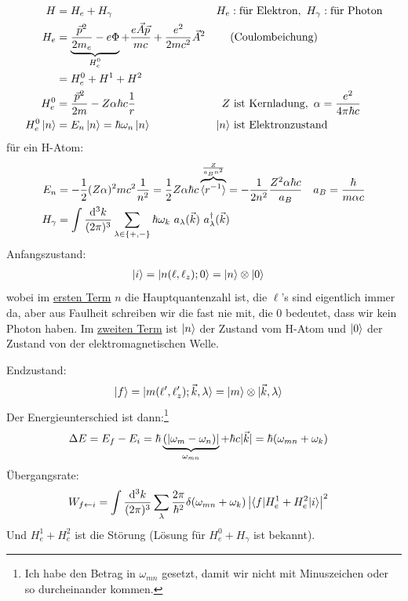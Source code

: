 		\begin{align*}
			H &= H_e + H_\gamma & H_e &: \text{für Elektron}, ~ H_\gamma : \text{für Photon} \\
			H_e &= \underbrace{\frac{\vec{p}^2}{2 m_e} - e \Phi}_{\mathclap{H_e^0}}
			+ \frac{e \vec{A} \vec{p}}{m c}
			+ \frac{e^2}{2 m c^2} \vec{A}^2 &
			&\text{(Coulombeichung)}\\
			&= H_e^0 + H^1 + H^2 \\
			H_e^0 &= \frac{\vec{p}^2}{2 m} - Z \alpha \hbar c \frac{1}{r} & 
			Z &~\text{ist Kernladung},~ \alpha = \frac{e^2}{4 \pi \hbar c}\\
			H_e^0 \ket{n} &= E_n \ket{n} = \hbar \omega_n \ket{n} & 
			\ket{n} &~ \text{ist Elektronzustand}
		\end{align*}	
für ein H-Atom:
		\begin{align*}
			E_n &= - \frac{1}{2} (Z \alpha)^2 m c^2 \frac{1}{n^2}
			= \frac{1}{2} Z \alpha \hbar c \overbrace{\erw{r^{-1}}}^{\mathclap{\frac{Z}{a_B n^2}}}
			= - \frac{1}{2 n^2} \frac{Z^2 \alpha \hbar c}{a_B} &
			a_B &= \frac{\hbar}{m \alpha c} \\
			H_\gamma &= \int \frac{\diff^3 k}{(2 \pi)^3}
			\sum_{\lambda \in \{+,-\}} \hbar \omega_k
			~a_\lambda (\vec{k})~a^\dagger_\lambda (\vec{k})
		\end{align*}
	Anfangszustand: 
		\begin{align*}
			\ket{i} &= \ket{n(\ell, \ell_z); 0} = \ket{n} \otimes \ket{0}
		\end{align*}
	wobei im \underline{ersten Term} $n$ die Hauptquantenzahl ist, die $\ell$'s sind eigentlich immer da, aber aus Faulheit schreiben wir die fast nie mit, die $0$ bedeutet, dass wir kein Photon haben. Im \underline{zweiten Term} ist $\ket{n}$ der Zustand vom H-Atom und $\ket{0}$ der Zustand von der elektromagnetischen Welle.
	
	Endzustand:
		\begin{align*}
			\ket{f} &= \ket{m(\ell', \ell_z'); \vec{k}, \lambda} 
			= \ket{m} \otimes \ket{\vec{k}, \lambda}
		\end{align*} 
	Der Energieunterschied ist dann:\footnote{Ich habe den Betrag in $\omega_{mn}$ gesetzt, damit wir nicht mit Minuszeichen oder so durcheinander kommen.}
		\begin{align*}
			\Delta E &= E_f - E_i = \hbar 
			\underbrace{(|\omega_m - \omega_n)|}_{\mathclap{\omega_{mn}}} 
			+ \hbar c |\vec{k}| = \hbar (\omega_{mn} + \omega_k)
		\end{align*}
	Übergangsrate: 
		\begin{align*}
			W_{f \leftarrow i} &= 
			\int \frac{\mathrm{d}^3 k}{(2 \pi)^3} \sum_\lambda
			\frac{2 \pi}{\hbar^2} \delta(\omega_{mn} + \omega_k)
			\left|\braket{f | H_e^1 + H_e^2 | i}\right|^2
		\end{align*}	
	Und $H_e^1 + H_e^2$ ist die Störung (Lösung für $H_e^0 + H_\gamma$ ist bekannt).
	
